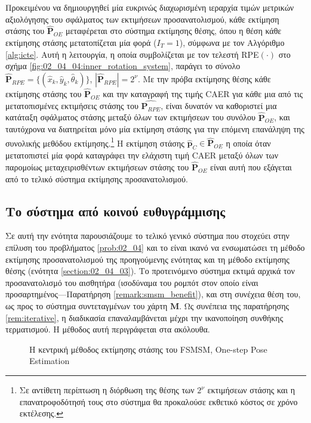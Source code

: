 Προκειμένου να δημιουργηθεί μία ευκρινώς διαχωρισμένη ιεραρχία τιμών μετρικών
αξιολόγησης του σφάλματος των εκτιμήσεων προσανατολισμού, κάθε εκτίμηση στάσης
του $\hat{\bm{P}}_{OE}$ μεταφέρεται στο σύστημα εκτίμησης θέσης, όπου η θέση
κάθε εκτίμησης στάσης μετατοπίζεται μία φορά ($I_T = 1$), σύμφωνα με τον
Αλγόριθμο \ref{alg:icte}. Αυτή η λειτουργία, η οποία συμβολίζεται με τον τελεστή
RPE$(\cdot)$ στο σχήμα \ref{fig:02_04_04:inner_rotation_system}, παράγει το
σύνολο $\hat{\bm{P}}_{RPE} = \{(\hat{x}_k, \hat{y}_k, \hat{\theta}_k)\}$,
$|\hat{\bm{P}}_{RPE}| = 2^\nu$.  Με την πρόβα εκτίμησης θέσης κάθε εκτίμησης
στάσης του $\hat{\bm{P}}_{OE}$ και την καταγραφή της τιμής CAER για κάθε μια
από τις μετατοπισμένες εκτιμήσεις στάσης του $\hat{\bm{P}_{RPE}}$, είναι
δυνατόν να καθοριστεί μια κατάταξη σφάλματος στάσης μεταξύ όλων των εκτιμήσεων
του συνόλου $\hat{\bm{P}}_{OE}$, και ταυτόχρονα να διατηρείται μόνο μία
εκτίμηση στάσης για την επόμενη επανάληψη της συνολικής μεθόδου
εκτίμησης.\footnote{Σε αντίθετη περίπτωση η διόρθωση της θέσης των $2^\nu$
εκτιμήσεων στάσης και η επανατροφοδότησή τους στο σύστημα θα προκαλούσε
εκθετικό κόστος σε χρόνο εκτέλεσης.} Η εκτίμηση στάσης $\hat{\bm{p}}_C \in
\hat{\bm{P}}_{OE}$ η οποία όταν μετατοπιστεί μία φορά καταγράφει την ελάχιστη
τιμή CAER μεταξύ όλων των παρομοίως μεταχειρισθέντων εκτιμήσεων στάσης του
$\hat{\bm{P}}_{OE}$ είναι αυτή που εξάγεται από το τελικό σύστημα εκτίμησης
προσανατολισμού.


\subsection{Το σύστημα από κοινού ευθυγράμμισης}
\label{subsection:02_04_04:02}

Σε αυτή την ενότητα παρουσιάζουμε το τελικό γενικό σύστημα που στοχεύει στην
επίλυση του προβλήματος \ref{prob:02_04} και το είναι ικανό να ενσωματώσει τη
μέθοδο εκτίμησης προσανατολισμού της προηγούμενης ενότητας και τη μέθοδο
εκτίμησης θέσης (ενότητα \ref{section:02_04_03}). Το προτεινόμενο σύστημα
εκτιμά αρχικά τον προσανατολισμό του αισθητήρα (ισοδύναμα του ρομπότ στον οποίο
είναι προσαρτημένος---Παρατήρηση \ref{remark:smsm_benefit}), και στη συνέχεια
θέση του, ως προς το σύστημα συντεταγμένων του χάρτη $\bm{M}$. Ως συνέπεια της
παρατήρησης \ref{rem:iterative}, η διαδικασία επαναλαμβάνεται μέχρι την
ικανοποίηση συνθήκης τερματισμού. Η μέθοδος αυτή περιγράφεται στα ακόλουθα.

\begin{figure}[!h]\centering
  
  \caption{\small Η κεντρική μέθοδος εκτίμησης στάσης του FSMSM,
           One-step Pose Estimation}
  \label{fig:02_04_04:inner_system}
\end{figure}


